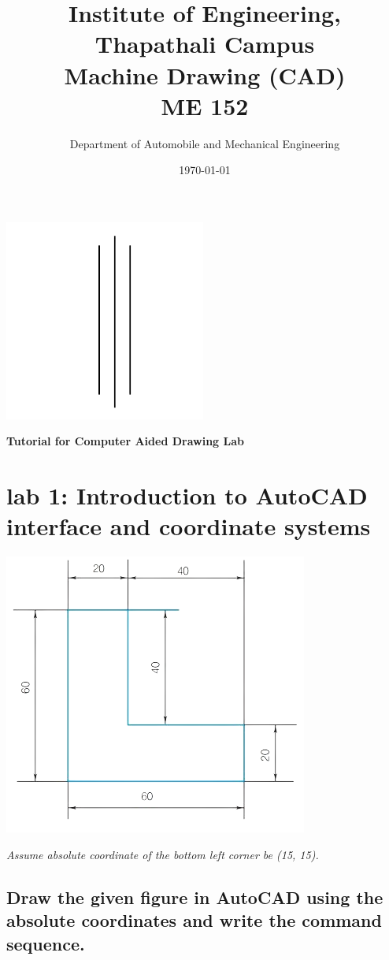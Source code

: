 \documentclass[a4paper, 12pt]{article}
\title{Institute of Engineering,\\ Thapathali Campus \\ Machine Drawing (CAD) \\ ME 152} %
\author{Department of Automobile and Mechanical Engineering}
\date{\today} %
\begin{document}
\maketitle %
	\begin{center}
		\includegraphics{gfx/lines.png}
	\end{center}
	\begin{center}
		\textbf{Tutorial for Computer Aided Drawing Lab}
	\end{center}
	
	\newpage
\section{lab 1: Introduction to AutoCAD interface and coordinate systems}
\begin{center}
	\includegraphics{gfx/fig.png}
\end{center}
\emph{Assume absolute coordinate of the bottom left corner be (15, 15).}
\subsection{Draw the given figure in AutoCAD using the absolute coordinates and write the command sequence.}
\end{document}

